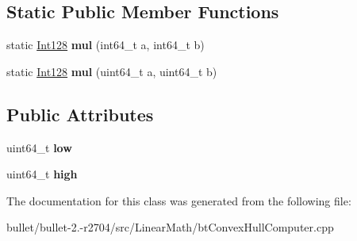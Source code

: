 \subsection*{Static Public Member Functions}
\begin{DoxyCompactItemize}
\item 
\hypertarget{classbt_convex_hull_internal_1_1_int128_ac3737330b8417809b11b94664042dc12}{static \hyperlink{classbt_convex_hull_internal_1_1_int128}{Int128} {\bfseries mul} (int64\+\_\+t a, int64\+\_\+t b)}\label{classbt_convex_hull_internal_1_1_int128_ac3737330b8417809b11b94664042dc12}

\item 
\hypertarget{classbt_convex_hull_internal_1_1_int128_aa62234c1a27cf8b3327413ccfde06d8a}{static \hyperlink{classbt_convex_hull_internal_1_1_int128}{Int128} {\bfseries mul} (uint64\+\_\+t a, uint64\+\_\+t b)}\label{classbt_convex_hull_internal_1_1_int128_aa62234c1a27cf8b3327413ccfde06d8a}

\end{DoxyCompactItemize}
\subsection*{Public Attributes}
\begin{DoxyCompactItemize}
\item 
\hypertarget{classbt_convex_hull_internal_1_1_int128_aeab001269c99bc766d2baef35a8aaaac}{uint64\+\_\+t {\bfseries low}}\label{classbt_convex_hull_internal_1_1_int128_aeab001269c99bc766d2baef35a8aaaac}

\item 
\hypertarget{classbt_convex_hull_internal_1_1_int128_a481438c6c1372ad316e572cdbacb6fc1}{uint64\+\_\+t {\bfseries high}}\label{classbt_convex_hull_internal_1_1_int128_a481438c6c1372ad316e572cdbacb6fc1}

\end{DoxyCompactItemize}


The documentation for this class was generated from the following file\+:\begin{DoxyCompactItemize}
\item 
bullet/bullet-\/2.-\/r2704/src/\+Linear\+Math/bt\+Convex\+Hull\+Computer.\+cpp\end{DoxyCompactItemize}

